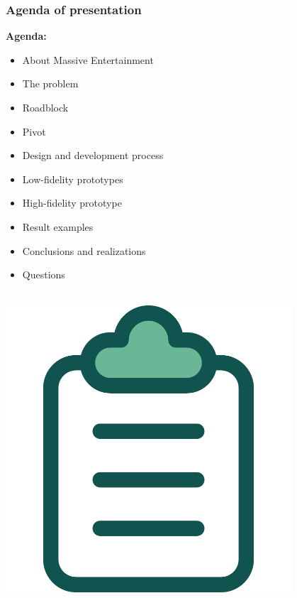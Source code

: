 \documentclass[xcolor=svgnames,10pt,aspectratio=1610]{beamer}
\begin{document}
\begin{frame}
  \frametitle{Agenda of presentation}
  \begin{minipage}{.43\textwidth}
    \textbf{Agenda:}
    \begin{itemize}
      \item{About Massive Entertainment}
      \item{The problem}
      \item{Roadblock}
      \item{Pivot}
      \item{Design and development process}
      \item{Low-fidelity prototypes}
      \item{High-fidelity prototype}
      \item{Result examples}
      \item{Conclusions and realizations}
      \item{Questions}
    \end{itemize}
  \end{minipage}
  \begin{minipage}{.49\textwidth}
    \vspace{-0.5cm} \\
    \hspace{2cm}\includegraphics[width=0.8\textwidth]{img/agenda.pdf}
  \end{minipage}
\end{frame}
\end{document}
